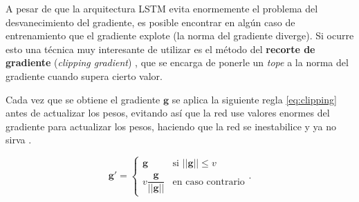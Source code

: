 A pesar de que la arquitectura LSTM evita enormemente el problema del desvanecimiento del gradiente, es posible encontrar en algún caso de entrenamiento que el gradiente explote (la norma del gradiente diverge). Si ocurre esto una técnica muy interesante de utilizar es el método del \textbf{recorte de gradiente} (\emph{clipping gradient}) \cite{pascanu2013difficulty}, que se encarga de ponerle un \emph{tope} a la norma del gradiente cuando supera cierto valor.

Cada vez que se obtiene el gradiente $\textbf{g}$ se aplica la siguiente regla \eqref{eq:clipping} antes de actualizar los pesos, evitando así que la red use valores enormes del gradiente para actualizar los pesos, haciendo que la red se inestabilice y ya no sirva \cite{Goodfellow-et-al-2016}.

\begin{equation}
  \textbf{g}' = \begin{cases} \textbf{g} & \text{si } ||\textbf{g}|| \leq v \\ v\dfrac{\textbf{g}}{||\textbf{g}||} & \text{en caso contrario} \end{cases}.
  \label{eq:clipping}
\end{equation}

\endinput
